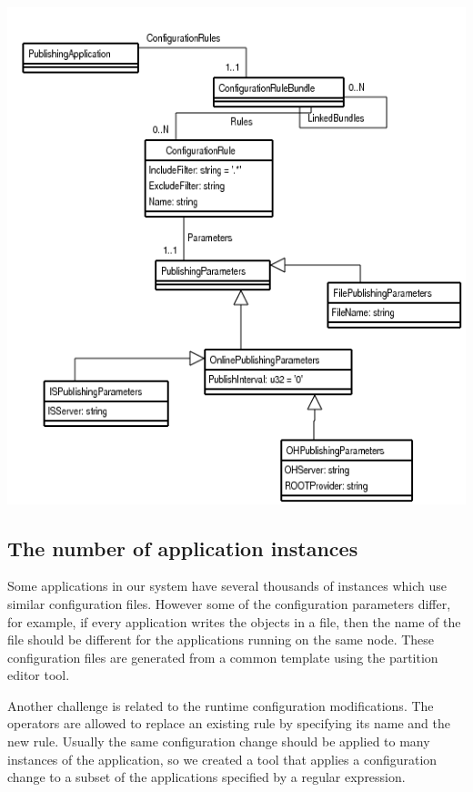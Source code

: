 \begin{center}
\includegraphics[scale=0.75]{Images/oks_schema.png}
\end{center}

\subsection*{The number of application instances}

Some applications in our system have several thousands of instances which use similar configuration files. However some of the configuration parameters differ, for example, if every application writes the objects in a file, then the name of the file should be different for the applications running on the same node. These configuration files are generated from a common template using the partition editor tool.

Another challenge is related to the runtime configuration modifications. The operators are allowed to replace an existing rule by specifying its name and the new rule. Usually the same configuration change should be applied to many instances of the application, so we created a tool that applies a configuration change to a subset of the applications specified by a regular expression.